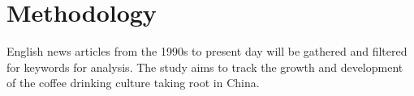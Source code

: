 \section{Methodology}\label{sec:Methodology}

English news articles from the 1990s to present day will be gathered and
filtered for keywords for analysis. The study aims to track the growth and
development of the coffee drinking culture taking root in China.
